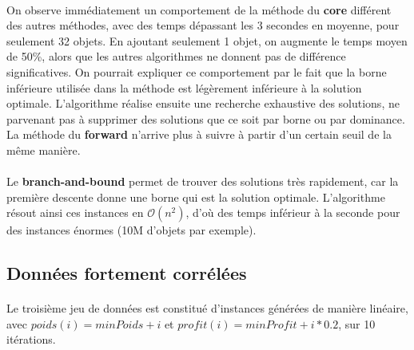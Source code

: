 \documentclass[12pt]{article}
\begin{document}
\paragraph{}On observe immédiatement un comportement de la méthode du \textbf{core} différent des autres méthodes, avec des temps dépassant les 3 secondes en moyenne, pour seulement 32 objets. En ajoutant seulement 1 objet, on augmente le temps moyen de 50\%, alors que les autres algorithmes ne donnent pas de différence significatives. On pourrait expliquer ce comportement par le fait que la borne inférieure utilisée dans la méthode est légèrement inférieure à la solution optimale. L'algorithme réalise ensuite une recherche exhaustive des solutions, ne parvenant pas à supprimer des solutions que ce soit par borne ou par dominance. La méthode du \textbf{forward} n'arrive plus à suivre à partir d'un certain seuil de la même manière.

\paragraph{}Le \textbf{branch-and-bound} permet de trouver des solutions très rapidement, car la première descente donne une borne qui est la solution optimale. L'algorithme résout ainsi ces instances en $\mathcal{O}(n^2)$, d'où des temps inférieur à la seconde pour des instances énormes (10M d'objets par exemple).


\subsection{Données fortement corrélées}

\paragraph{}Le troisième jeu de données est constitué d'instances générées de manière linéaire, avec $poids(i) = minPoids+i$ et $profit(i) = minProfit+i*0.2 $, sur 10 itérations.
\end{document}
